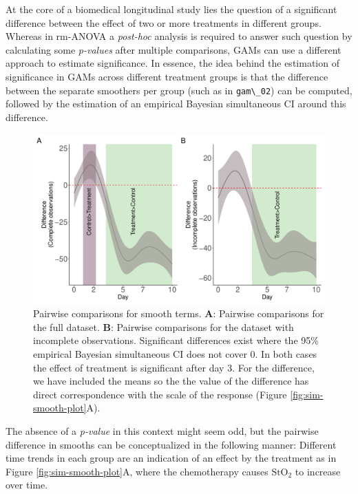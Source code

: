 \documentclass[
]{article}
\newcommand{\passthrough}[1]{#1}
\begin{document}
At the core of a biomedical longitudinal study lies the question of a significant difference between the effect of two or more treatments in different groups. Whereas in rm-ANOVA a \emph{post-hoc} analysis is required to answer such question by calculating some \emph{p-values} after multiple comparisons, GAMs can use a different approach to estimate significance. In essence, the idea behind the estimation of significance in GAMs across different treatment groups is that the difference between the separate smoothers per group (such as in \passthrough{\lstinline!gam\_02!}) can be computed, followed by the estimation of an empirical Bayesian simultaneous CI around this difference.



\begin{figure}

{\centering \includegraphics[width=1\linewidth]{Main_manuscript_files/figure-latex/plot-pairwise-comp-1} 

}

\caption{Pairwise comparisons for smooth terms. \textbf{A}: Pairwise comparisons for the full dataset. \textbf{B}: Pairwise comparisons for the dataset with incomplete observations. Significant differences exist where the 95\% empirical Bayesian simultaneous CI does not cover 0. In both cases the effect of treatment is significant after day 3. For the difference, we have included the means so the the value of the difference has direct correspondence with the scale of the response (Figure \ref{fig:sim-smooth-plot}A).}\label{fig:plot-pairwise-comp}
\end{figure}

The absence of a \emph{p-value} in this context might seem odd, but the pairwise difference in smooths can be conceptualized in the following manner: Different time trends in each group are an indication of an effect by the treatment as in Figure \ref{fig:sim-smooth-plot}A, where the chemotherapy causes \(\mbox{StO}_2\) to increase over time.
\end{document}
